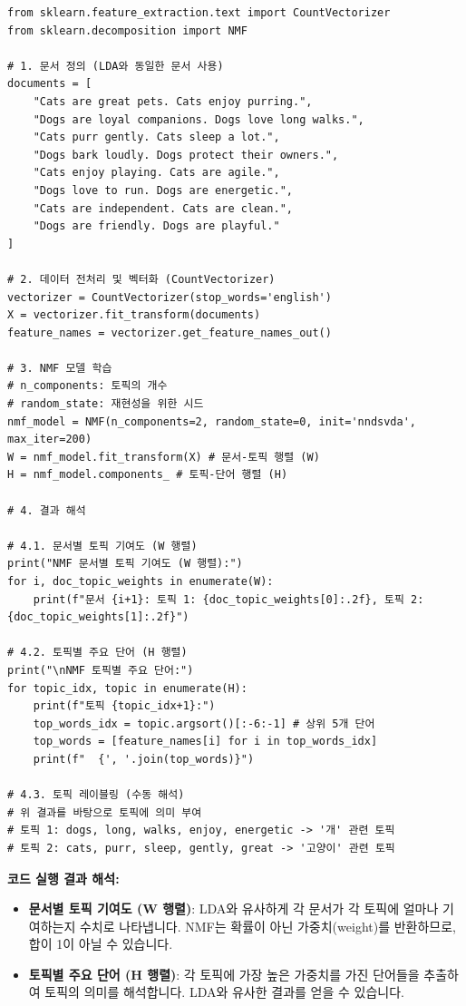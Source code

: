 \documentclass[11pt,a4paper]{article}
\begin{document}
\begin{lstlisting}[caption={Python을 이용한 NMF 구현 예시}, label={lst:python_nmf}]
from sklearn.feature_extraction.text import CountVectorizer
from sklearn.decomposition import NMF

# 1. 문서 정의 (LDA와 동일한 문서 사용)
documents = [
    "Cats are great pets. Cats enjoy purring.",
    "Dogs are loyal companions. Dogs love long walks.",
    "Cats purr gently. Cats sleep a lot.",
    "Dogs bark loudly. Dogs protect their owners.",
    "Cats enjoy playing. Cats are agile.",
    "Dogs love to run. Dogs are energetic.",
    "Cats are independent. Cats are clean.",
    "Dogs are friendly. Dogs are playful."
]

# 2. 데이터 전처리 및 벡터화 (CountVectorizer)
vectorizer = CountVectorizer(stop_words='english')
X = vectorizer.fit_transform(documents)
feature_names = vectorizer.get_feature_names_out()

# 3. NMF 모델 학습
# n_components: 토픽의 개수
# random_state: 재현성을 위한 시드
nmf_model = NMF(n_components=2, random_state=0, init='nndsvda', max_iter=200)
W = nmf_model.fit_transform(X) # 문서-토픽 행렬 (W)
H = nmf_model.components_ # 토픽-단어 행렬 (H)

# 4. 결과 해석

# 4.1. 문서별 토픽 기여도 (W 행렬)
print("NMF 문서별 토픽 기여도 (W 행렬):")
for i, doc_topic_weights in enumerate(W):
    print(f"문서 {i+1}: 토픽 1: {doc_topic_weights[0]:.2f}, 토픽 2: {doc_topic_weights[1]:.2f}")

# 4.2. 토픽별 주요 단어 (H 행렬)
print("\nNMF 토픽별 주요 단어:")
for topic_idx, topic in enumerate(H):
    print(f"토픽 {topic_idx+1}:")
    top_words_idx = topic.argsort()[:-6:-1] # 상위 5개 단어
    top_words = [feature_names[i] for i in top_words_idx]
    print(f"  {', '.join(top_words)}")

# 4.3. 토픽 레이블링 (수동 해석)
# 위 결과를 바탕으로 토픽에 의미 부여
# 토픽 1: dogs, long, walks, enjoy, energetic -> '개' 관련 토픽
# 토픽 2: cats, purr, sleep, gently, great -> '고양이' 관련 토픽
\end{lstlisting}

\begin{examplebox}
\textbf{코드 실행 결과 해석:}
\begin{itemize}
    \item \textbf{문서별 토픽 기여도 (W 행렬)}: LDA와 유사하게 각 문서가 각 토픽에 얼마나 기여하는지 수치로 나타냅니다. NMF는 확률이 아닌 가중치(weight)를 반환하므로, 합이 1이 아닐 수 있습니다.
    \item \textbf{토픽별 주요 단어 (H 행렬)}: 각 토픽에 가장 높은 가중치를 가진 단어들을 추출하여 토픽의 의미를 해석합니다. LDA와 유사한 결과를 얻을 수 있습니다.
\end{itemize}
\end{examplebox}
\end{document}
